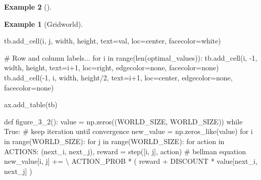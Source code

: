 \documentclass[
  letterpaper,
]{krantz}
\makeatletter
\newenvironment{Shaded}{\begin{snugshade}}{\end{snugshade}}
\newcommand{\BuiltInTok}[1]{\textcolor[rgb]{0.00,0.23,0.31}{#1}}
\newcommand{\CommentTok}[1]{\textcolor[rgb]{0.37,0.37,0.37}{#1}}
\newcommand{\ControlFlowTok}[1]{\textcolor[rgb]{0.00,0.23,0.31}{#1}}
\newcommand{\DecValTok}[1]{\textcolor[rgb]{0.68,0.00,0.00}{#1}}
\newcommand{\KeywordTok}[1]{\textcolor[rgb]{0.00,0.23,0.31}{#1}}
\newcommand{\NormalTok}[1]{\textcolor[rgb]{0.00,0.23,0.31}{#1}}
\newcommand{\OperatorTok}[1]{\textcolor[rgb]{0.37,0.37,0.37}{#1}}
\newcommand{\StringTok}[1]{\textcolor[rgb]{0.13,0.47,0.30}{#1}}
\newcommand{\VariableTok}[1]{\textcolor[rgb]{0.07,0.07,0.07}{#1}}
\newenvironment{kframe}{%
\medskip{}
\setlength{\fboxsep}{.8em}
 \def\at@end@of@kframe{}%
 \ifinner\ifhmode%
  \def\at@end@of@kframe{\end{minipage}}%
  \begin{minipage}{\columnwidth}%
 \fi\fi%
 \def\FrameCommand##1{\hskip\@totalleftmargin \hskip-\fboxsep
 \colorbox{shadecolor}{##1}\hskip-\fboxsep
     \hskip-\linewidth \hskip-\@totalleftmargin \hskip\columnwidth}%
 \MakeFramed {\advance\hsize-\width
   \@totalleftmargin\z@ \linewidth\hsize
   \@setminipage}}%
 {\par\unskip\endMakeFramed%
 \at@end@of@kframe}
\renewenvironment{Shaded}{\begin{kframe}}{\end{kframe}}
\theoremstyle{plain}
\theoremstyle{definition}
\newtheorem{example}{Example}[chapter]
\theoremstyle{definition}
\theoremstyle{remark}
\makeatother
\begin{document}
\begin{example}[]
\begin{example}[Gridworld]
\begin{tcolorbox}[enhanced jigsaw, bottomrule=.15mm, opacityback=0, breakable, colframe=quarto-callout-tip-color-frame, left=2mm, rightrule=.15mm, toprule=.15mm, leftrule=.75mm, arc=.35mm, colback=white]
\begin{codelisting}[H]
\begin{Shaded}
\begin{Highlighting}[]
\NormalTok{        tb.add\_cell(i, j, width, height, text}\OperatorTok{=}\NormalTok{val,}
\NormalTok{                loc}\OperatorTok{=}\StringTok{\textquotesingle{}center\textquotesingle{}}\NormalTok{, facecolor}\OperatorTok{=}\StringTok{\textquotesingle{}white\textquotesingle{}}\NormalTok{)}

    \CommentTok{\# Row and column labels...}
    \ControlFlowTok{for}\NormalTok{ i }\KeywordTok{in} \BuiltInTok{range}\NormalTok{(}\BuiltInTok{len}\NormalTok{(optimal\_values)):}
\NormalTok{        tb.add\_cell(i, }\OperatorTok{{-}}\DecValTok{1}\NormalTok{, width, height, text}\OperatorTok{=}\NormalTok{i}\OperatorTok{+}\DecValTok{1}\NormalTok{, loc}\OperatorTok{=}\StringTok{\textquotesingle{}right\textquotesingle{}}\NormalTok{,}
\NormalTok{                    edgecolor}\OperatorTok{=}\StringTok{\textquotesingle{}none\textquotesingle{}}\NormalTok{, facecolor}\OperatorTok{=}\StringTok{\textquotesingle{}none\textquotesingle{}}\NormalTok{)}
\NormalTok{        tb.add\_cell(}\OperatorTok{{-}}\DecValTok{1}\NormalTok{, i, width, height}\OperatorTok{/}\DecValTok{2}\NormalTok{, text}\OperatorTok{=}\NormalTok{i}\OperatorTok{+}\DecValTok{1}\NormalTok{, loc}\OperatorTok{=}\StringTok{\textquotesingle{}center\textquotesingle{}}\NormalTok{,}
\NormalTok{                   edgecolor}\OperatorTok{=}\StringTok{\textquotesingle{}none\textquotesingle{}}\NormalTok{, facecolor}\OperatorTok{=}\StringTok{\textquotesingle{}none\textquotesingle{}}\NormalTok{)}

\NormalTok{    ax.add\_table(tb)}


\KeywordTok{def}\NormalTok{ figure\_3\_2():}
\NormalTok{    value }\OperatorTok{=}\NormalTok{ np.zeros((WORLD\_SIZE, WORLD\_SIZE))}
    \ControlFlowTok{while} \VariableTok{True}\NormalTok{:}
        \CommentTok{\# keep iteration until convergence}
\NormalTok{        new\_value }\OperatorTok{=}\NormalTok{ np.zeros\_like(value)}
        \ControlFlowTok{for}\NormalTok{ i }\KeywordTok{in} \BuiltInTok{range}\NormalTok{(WORLD\_SIZE):}
            \ControlFlowTok{for}\NormalTok{ j }\KeywordTok{in} \BuiltInTok{range}\NormalTok{(WORLD\_SIZE):}
                \ControlFlowTok{for}\NormalTok{ action }\KeywordTok{in}\NormalTok{ ACTIONS:}
\NormalTok{                    (next\_i, next\_j), reward }\OperatorTok{=}\NormalTok{ step([i, j], action)}
                    \CommentTok{\# bellman equation}
\NormalTok{                    new\_value[i, j] }\OperatorTok{+=} \OperatorTok{\textbackslash{}}
\NormalTok{                        ACTION\_PROB }\OperatorTok{*}\NormalTok{ (}
\NormalTok{                                reward }\OperatorTok{+}\NormalTok{ DISCOUNT }\OperatorTok{*}\NormalTok{ value[next\_i, next\_j]}
\NormalTok{                        )}
                    

\end{Highlighting}
\end{Shaded}
\end{codelisting}
\end{tcolorbox}
\end{example}
\end{example}
\end{document}
